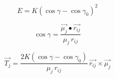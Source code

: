 \documentclass[12pt]{article}
\begin{document}
$$
   E = K (\cos\gamma - \cos\gamma_0)^2 
$$

$$
   \cos\gamma = \frac{\vec{\mu_j}\bullet\vec{r_{ij}}}{\mu_j\,r_{ij}}
$$

$$
\vec{T_j} = \frac{2K(\cos\gamma - \cos\gamma_0)}{\mu_j\,r_{ij}}\,
           \vec{r_{ij}} \times \vec{\mu_j}
$$
\end{document}

